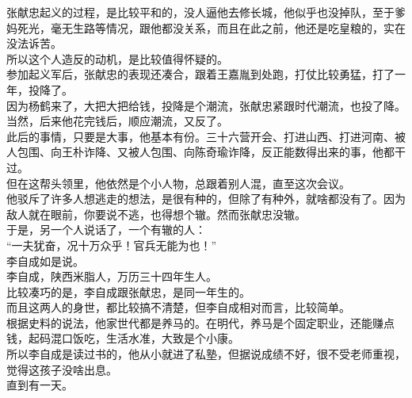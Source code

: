 \begin{multicols}{\theparacolNo}
张献忠起义的过程，是比较平和的，没人逼他去修长城，他似乎也没掉队，至于爹妈死光，毫无生路等情况，跟他都没关系，而且在此之前，他还是吃皇粮的，实在没法诉苦。\\

所以这个人造反的动机，是比较值得怀疑的。\\

参加起义军后，张献忠的表现还凑合，跟着王嘉胤到处跑，打仗比较勇猛，打了一年，投降了。\\

因为杨鹤来了，大把大把给钱，投降是个潮流，张献忠紧跟时代潮流，也投了降。\\

当然，后来他花完钱后，顺应潮流，又反了。\\

此后的事情，只要是大事，他基本有份。三十六营开会、打进山西、打进河南、被人包围、向王朴诈降、又被人包围、向陈奇瑜诈降，反正能数得出来的事，他都干过。\\

但在这帮头领里，他依然是个小人物，总跟着别人混，直至这次会议。\\

他驳斥了许多人想逃走的想法，是很有种的，但除了有种外，就啥都没有了。因为敌人就在眼前，你要说不逃，也得想个辙。然而张献忠没辙。\\

于是，另一个人说话了，一个有辙的人：\\

“一夫犹奋，况十万众乎！官兵无能为也！”\\

李自成如是说。\\

李自成，陕西米脂人，万历三十四年生人。\\

比较凑巧的是，李自成跟张献忠，是同一年生的。\\

而且这两人的身世，都比较搞不清楚，但李自成相对而言，比较简单。\\

根据史料的说法，他家世代都是养马的。在明代，养马是个固定职业，还能赚点钱，起码混口饭吃，生活水准，大致是个小康。\\

所以李自成是读过书的，他从小就进了私塾，但据说成绩不好，很不受老师重视，觉得这孩子没啥出息。\\

直到有一天。\\


\end{multicols}
